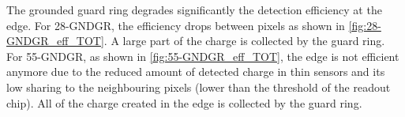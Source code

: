 The grounded guard ring degrades significantly the detection
efficiency at the edge. For 28-GNDGR, the efficiency drops between
pixels as shown in \cref{fig:28-GNDGR_eff_TOT}. A large part of the
charge is collected by the guard ring. For 55-GNDGR, as shown in
\cref{fig:55-GNDGR_eff_TOT}, the edge is not efficient anymore due to
the reduced amount of detected charge in thin sensors and its low
sharing to the neighbouring pixels (lower than the threshold of the
readout chip). All of the charge created in the edge is collected by
the guard ring.

\begin{figure}[htbp]
  \begin{subfigure}[b]{0.5\textwidth}
    \centering
    \caption{}
  \end{subfigure}~
  \begin{subfigure}[b]{0.5\textwidth}
    \centering
\end{subfigure}
\end{figure}
